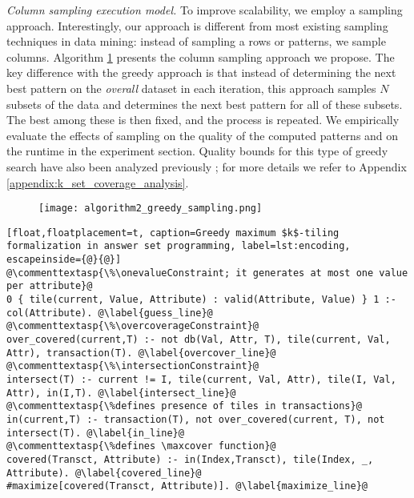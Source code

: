 \textit{Column sampling execution model.} To improve scalability, we employ a sampling approach. Interestingly, our approach is different from most existing sampling techniques in data mining: instead of sampling a rows or patterns, we sample columns. Algorithm \ref{sampling} presents the column sampling approach we propose. The key difference with the greedy approach is that instead of determining the 
next best pattern on the {\em overall} dataset in each iteration, this approach samples $N$ subsets of the data
and determines the next best pattern for all of these subsets. The best among these is then fixed,
and the process is repeated. We empirically evaluate the effects of sampling
on the quality of the computed patterns and on the runtime in the experiment section. \changesb Quality bounds for this type of greedy search have also been analyzed previously \parencite{max_k_set_cover1}; for more details we refer to Appendix \ref{appendix:k_set_coverage_analysis}. \changese
\begin{figure}[thb]
 \label{sampling}
\texttt{[image: algorithm2\_greedy\_sampling.png]}
\end{figure}

\begin{lstlisting}[float,floatplacement=t, caption=Greedy maximum $k$-tiling formalization in answer set programming, label=lst:encoding, escapeinside={@}{@}] 
@\commenttextasp{\%\onevalueConstraint; it generates at most one value per attribute}@
0 { tile(current, Value, Attribute) : valid(Attribute, Value) } 1 :- col(Attribute). @\label{guess_line}@
@\commenttextasp{\%\overcoverageConstraint}@
over_covered(current,T) :- not db(Val, Attr, T), tile(current, Val, Attr), transaction(T). @\label{overcover_line}@
@\commenttextasp{\%\intersectionConstraint}@
intersect(T) :- current != I, tile(current, Val, Attr), tile(I, Val, Attr), in(I,T). @\label{intersect_line}@
@\commenttextasp{\%defines presence of tiles in transactions}@
in(current,T) :- transaction(T), not over_covered(current, T), not intersect(T). @\label{in_line}@
@\commenttextasp{\%defines \maxcover function}@
covered(Transct, Attribute) :- in(Index,Transct), tile(Index, _, Attribute). @\label{covered_line}@
#maximize[covered(Transct, Attribute)]. @\label{maximize_line}@
\end{lstlisting}

